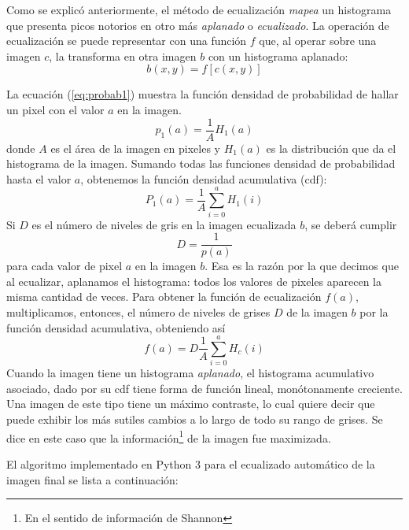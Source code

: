 \documentclass[a4paper, 12pt]{article}
\begin{document}
Como se explicó anteriormente, el método de ecualización {\it mapea} un histograma que presenta picos notorios en otro más {\it aplanado} o {\it ecualizado}. La operación de ecualización se puede representar con una función $f$ que, al operar sobre una imagen $c$, la transforma en otra imagen $b$ con un histograma aplanado:
\begin{equation}
  \label{eq:ecualiz}
  b(x,y)=f[c(x,y)]
\end{equation}

La ecuación (\ref{eq:probab1}) muestra la función densidad de probabilidad de hallar un pixel con el valor $a$ en la imagen.
\begin{equation}
  \label{eq:probab1}
  p_1(a)=\frac{1}{A} H_1(a)
\end{equation}
donde $A$ es el área de la imagen en pixeles y $H_1(a)$ es la distribución que da el histograma de la imagen. Sumando todas las funciones densidad de probabilidad hasta el valor $a$, obtenemos la función densidad acumulativa (cdf):
\begin{equation}
  \label{eq:cdf}
  P_1(a)=\frac{1}{A} \sum_{i=0}^a H_1(i)
\end{equation}
Si $D$ es el número de niveles de gris en la imagen ecualizada $b$, se deberá cumplir $$D=\frac{1}{p(a)}$$ para cada valor de pixel $a$ en la imagen $b$. Esa es la razón por la que decimos que al ecualizar, aplanamos el histograma: todos los valores de pixeles aparecen la misma cantidad de veces.
Para obtener la función de ecualización $f(a)$, multiplicamos, entonces, el número de niveles de grises $D$ de la imagen $b$ por la función densidad acumulativa, obteniendo así
\begin{equation}
  \label{eq:f}
  f(a)=D\frac{1}{A} \sum_{i=0}^a H_c(i)
\end{equation}
Cuando la imagen tiene un histograma {\it aplanado}, el histograma acumulativo asociado, dado por su cdf tiene forma de función lineal, monótonamente creciente. Una imagen de este tipo tiene un máximo contraste, lo cual quiere decir que puede exhibir los más sutiles cambios a lo largo de todo su rango de grises. Se dice en este caso que la información\footnote{En el sentido de información de Shannon} de la imagen fue maximizada\cite{easton}.

El algoritmo implementado en Python 3 para el ecualizado automático de la imagen final se lista a continuación:


\end{document}
